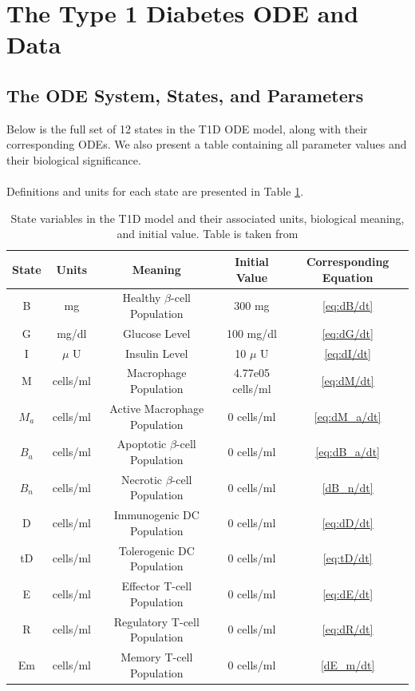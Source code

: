 \begin{appendices} \label{APPENDIX}
\section{The Type 1 Diabetes ODE and Data} \label{general_appendix}
\subsection{The ODE System, States, and Parameters}
Below is the full set of 12 states in the T1D ODE model, along with their corresponding ODEs. We also present a table containing all parameter values and their biological significance. \\
\\
Definitions and units for each state are presented in Table \ref{table:StateNotationAppendix}.

\begin{table}[H]
\centering
        \begin{tabular}{c|c|c|c|c}
        \cline{1-5}
            \textbf{State}  & \textbf{Units} &  \textbf{Meaning} & \textbf{Initial Value} & \textbf{Corresponding Equation}\\
            \hline
            B & mg & Healthy $\beta$-cell Population & 300 mg & \ref{eq:dB/dt}\\
            G & mg/dl & Glucose Level & 100 mg/dl & \ref{eq:dG/dt}\\
            I & $\mu$ U & Insulin Level & 10 $\mu$ U & \ref{eq:dI/dt}\\
            M & cells/ml & Macrophage Population & 4.77e05 cells/ml & \ref{eq:dM/dt}\\
            $M_a$ & cells/ml & Active Macrophage Population & 0 cells/ml & \ref{eq:dM_a/dt}\\
            $B_a$ & cells/ml & Apoptotic $\beta$-cell Population & 0 cells/ml & \ref{eq:dB_a/dt}\\
            $B_n$ & cells/ml & Necrotic $\beta$-cell Population & 0 cells/ml & \ref{dB_n/dt}\\
            D & cells/ml & Immunogenic DC Population & 0 cells/ml & \ref{eq:dD/dt}\\
            tD & cells/ml & Tolerogenic DC Population & 0 cells/ml & \ref{eq:tD/dt}\\
            E & cells/ml & Effector T-cell Population & 0 cells/ml & \ref{eq:dE/dt}\\
            R & cells/ml & Regulatory T-cell Population & 0 cells/ml & \ref{eq:dR/dt}\\
            Em & cells/ml & Memory T-cell Population & 0 cells/ml & \ref{dE_m/dt}
        \end{tabular}
    \caption{State variables in the T1D model and their associated units, biological meaning, and initial value. Table is taken from \cite{WuThesis}}
    \label{table:StateNotationAppendix} 
\end{table}





\end{appendices}
